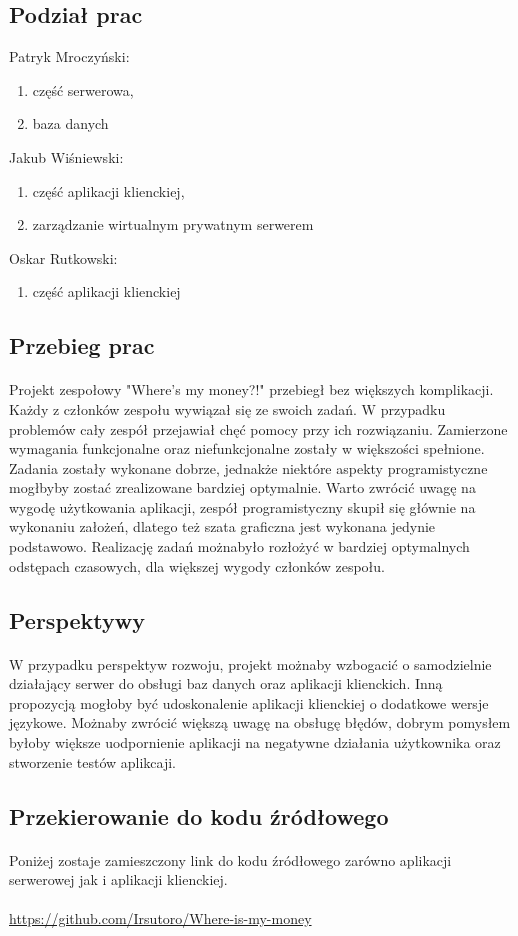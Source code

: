 \documentclass{article}
\begin{document}
\subsection{Podział prac}
Patryk Mroczyński:
\begin{enumerate}
	\item część serwerowa,
	\item baza danych
\end{enumerate}
Jakub Wiśniewski:
\begin{enumerate}
	\item część aplikacji klienckiej,
	\item zarządzanie wirtualnym prywatnym serwerem
\end{enumerate}
Oskar Rutkowski:
\begin{enumerate}
	\item część aplikacji klienckiej
\end{enumerate}
\subsection{Przebieg prac}
\paragraph *{} Projekt zespołowy "Where's my money?!" przebiegł bez większych komplikacji. Każdy z członków zespołu wywiązał się ze swoich zadań. W przypadku problemów cały zespół przejawiał chęć pomocy przy ich rozwiązaniu. Zamierzone wymagania funkcjonalne oraz niefunkcjonalne zostały w większości spełnione. Zadania zostały wykonane dobrze, jednakże niektóre aspekty programistyczne mogłbyby zostać zrealizowane bardziej optymalnie. Warto zwrócić uwagę na wygodę użytkowania aplikacji, zespół programistyczny skupił się głównie na wykonaniu założeń, dlatego też szata graficzna jest wykonana jedynie podstawowo. Realizację zadań możnabyło rozłożyć w bardziej optymalnych odstępach czasowych, dla większej wygody członków zespołu.
\subsection{Perspektywy}
\paragraph*{} W przypadku perspektyw rozwoju, projekt możnaby wzbogacić o samodzielnie działający serwer do obsługi baz danych oraz aplikacji klienckich. Inną propozycją mogłoby być udoskonalenie aplikacji klienckiej o dodatkowe wersje językowe. Możnaby zwrócić większą uwagę na obsługę błędów, dobrym pomysłem byłoby większe uodpornienie aplikacji na negatywne działania użytkownika oraz stworzenie testów aplikcaji.
\subsection{Przekierowanie do kodu źródłowego}
\paragraph*{} Poniżej zostaje zamieszczony link do kodu źródłowego zarówno aplikacji serwerowej jak i aplikacji klienckiej.
\paragraph*{}
\url{https://github.com/Irsutoro/Where-is-my-money}
\end{document}
